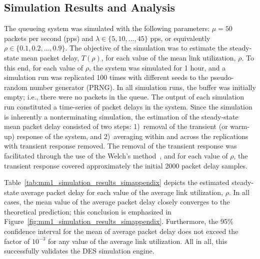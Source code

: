 \subsection{Simulation Results and Analysis}
\label{sub:simulation_results_and_analysis_simappendix}
The queueing system was simulated with the following parameters: $\mu=50$ packets per second (pps) and $\lambda\in\{5,10,\ldots,45\}$ pps, or equivalently $\rho\in\{0.1,0.2,\ldots,0.9\}$. The objective of the simulation was to estimate the steady-state mean packet delay, $T(\rho)$, for each value of the mean link utilization, $\rho$. To this end, for each value of $\rho$, the system was simulated for 1 hour, and a simulation run was replicated 100 times with different seeds to the pseudo-random number generator (PRNG). In all simulation runs, the buffer was initially empty; i.e., there were no packets in the queue. The output of each simulation run constituted a time-series of packet delays in the system. Since the simulation is inherently a nonterminating simulation, the estimation of the steady-state mean packet delay consisted of two steps: 1)~removal of the transient (or warm-up) response of the system, and 2)~averaging within and across the replications with transient response removed. The removal of the transient response was facilitated through the use of the Welch's method~\cite{LawChapter92007}, and for each value of $\rho$, the transient response covered approximately the initial 2000 packet delay samples.

Table~\ref{tab:mm1_simulation_results_simappendix} depicts the estimated steady-state average packet delay for each value of the average link utilization, $\rho$. In all cases, the mean value of the average packet delay closely converges to the theoretical prediction; this conclusion is emphasized in Figure~\ref{fig:mm1_simulation_results_simappendix}. Furthermore, the 95\% confidence interval for the mean of average packet delay does not exceed the factor of $10^{-3}$ for any value of the average link utilization. All in all, this successfully validates the DES simulation engine.


